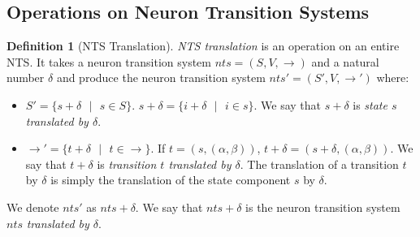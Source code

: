 \documentclass[]{elsarticle}
\theoremstyle{definition}
\newtheorem{definition2}{Definition}
\theoremstyle{definition}
\newcommand{\ra}{\rightarrow}
\newcommand{\se}{\text{ }}
\newcommand{\comment}[1]{}
\begin{document}
\subsection{Operations on Neuron Transition Systems}\label{sec-homo-ops}

\comment
{
We will define two operations on labelled transition systems, \emph{LTS translation} and \emph{LTS
scaling}. The idea behind these operations is that they take an LTS and a parameter $\delta$ and 
produce a new LTS that behaves exactly like the original LTS. When you are combining two different
rule sets from two different neurons in order to have common rule set, simply getting the union of
the two rule sets can cause conflicts. For example, let $\{a \ra a, a^2/a\ra a\}$ be the rule set 
of neuron $x$ and $\{a\ra\lambda,a^2/a\ra a\}$ be the rule set of neuron $y$. If we simply combine
the rule sets to have the common rule set $\{a\ra\lambda,a\ra a, a^2/a\ra a\}$ for both neurons
$x$ and $y$, there will be an unwanted behavior. If neuron $x$ has $1$ spike it
should use the rule $a\ra a$ and if neuron $y$ has $1$ spike it should use the rule $a\ra \lambda$.
If neurons $x$ and $y$ use the common rule set, when they have $1$ spike both of them will have
a non-deterministic choice, use rule $a\ra \lambda$ or use rule $a\ra a$. This non-determinism is 
an unwanted behavior that is the result of rule $a\ra\lambda$ `conflicting' with rule $a\ra a$. The 
common rule set changes the behavior of both neuron $x$ and neuron $y$. LTS translation and LTS 
scaling will be used to avoid such conflicts and changes in the neurons' behavior when combining
different rule sets. 
}


\begin{definition2}[NTS Translation]
\emph{NTS translation} is an operation on an entire NTS. It takes a neuron transition system $nts=
(S,V,\ra)$ and a natural number $\delta$ and produce the neuron transition system $nts'=(S',V,\ra')$
where:
\begin{itemize}
   \item $S'=\{s+\delta\se|\se s \in S\}$. $s+\delta = \{i+\delta\se|\se i\in s\}$. We say that $s+
         \delta$ is \emph{state $s$ translated by $\delta$}.
   \item $\ra'=\{t+\delta \se|\se t\in \ra \}$. If $t=(s, (\alpha,\beta))$, $t+\delta=(s+\delta,
         (\alpha,\beta))$. We say that $t+\delta$ is \emph{transition $t$ translated by $\delta$}. 
         The translation of a transition $t$ by $\delta$ is simply the translation of the state
         component $s$ by $\delta$.
\end{itemize}
We denote $nts'$ as $nts+\delta$. We say that $nts+\delta$ is the neuron transition system $nts$
\emph{translated by $\delta$}.
\end{definition2}
\end{document}

